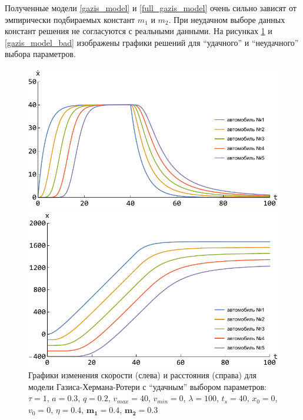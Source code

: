 \documentclass[12pt, a4paper]{extarticle}
\numberwithin{equation}{section}
\begin{document}
Полученные модели \eqref{gazis_model} и \eqref{full_gazis_model} очень сильно зависят от эмпирически подбираемых констант $m_1$ и $m_2$. При неудачном выборе данных констант решения не согласуются с реальными данными. На рисунках \ref{gazis_model_good} и \ref{gazis_model_bad} изображены графики решений для ``удачного'' и ``неудачного'' выбора параметров. 
\begin{figure}[h!]
	\begin{center}
		\begin{minipage}[h!]{0.48\linewidth}
			\includegraphics[width=1\linewidth,height=0.2\textheight]
			{Images/gazis_model_good_speed.pdf}
		\end{minipage}
		\hfill 
		\begin{minipage}[h!]{0.48\linewidth}
			\includegraphics[width=1\linewidth,height=0.2\textheight]
			{Images/gazis_model_good_distance.pdf}
		\end{minipage}
		\caption{Графики изменения скорости (слева) и расстояния (справа) для модели Газиса-Хермана-Ротери с ``удачным'' выбором параметров: $\tau=1$, $a=0.3$, $q=0.2$, $v_{max}=40$, $v_{min}=0$, $\lambda=100$, $t_s=40$, $x_0=0$, $v_0=0$, $\eta=0.4$, $\boldsymbol{m_1=0.4}$, $\boldsymbol{m_2=0.3}$}
		\label{gazis_model_good}
	\end{center}
\end{figure}
\end{document}
